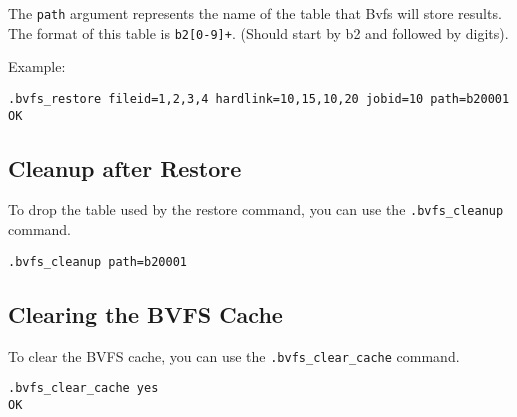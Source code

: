 The \texttt{path} argument represents the name of the table that Bvfs will
store results. The format of this table is \texttt{b2[0-9]+}. (Should start by
b2 and followed by digits).

Example:

\begin{verbatim}
.bvfs_restore fileid=1,2,3,4 hardlink=10,15,10,20 jobid=10 path=b20001
OK
\end{verbatim}

\subsection*{Cleanup after Restore}

To drop the table used by the restore command, you can use the
\texttt{.bvfs\_cleanup} command.

\begin{verbatim}
.bvfs_cleanup path=b20001
\end{verbatim}

\subsection*{Clearing the BVFS Cache}

To clear the BVFS cache, you can use the \texttt{.bvfs\_clear\_cache} command.

\begin{verbatim}
.bvfs_clear_cache yes
OK
\end{verbatim}
